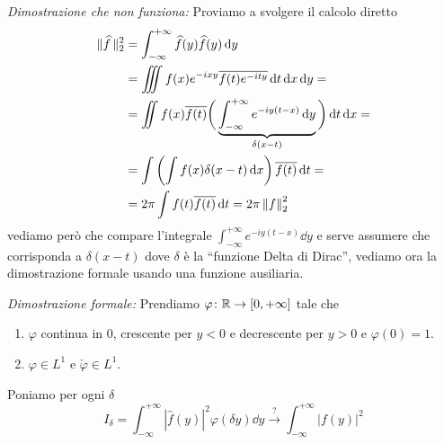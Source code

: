 \textit{Dimostrazione che non funziona:}
Proviamo a svolgere il calcolo diretto
$$
\begin{aligned}
	\|\widehat f\,\|_2^2 
	&= \int_{-\infty}^{+\infty} \widehat f(y) \widehat f(y) \,\mathrm{d} y \\
	&= \iiint f(x) e^{-ixy} \overline{f(t) e^{-ity}} \,\mathrm{d} t \,\mathrm{d} x \,\mathrm{d} y = \\
	&= \iint f(x) \overline{f(t)} \bigg( \underbrace{\int_{-\infty}^{+\infty} e^{-iy(t-x)} \,\mathrm{d} y}_{\delta(x-t)} \bigg) \,\mathrm{d} t \,\mathrm{d} x = \\
	&= \int \left( \int f(x) \delta(x - t) \,\mathrm{d} x \right) \overline{f(t)} \,\mathrm{d} t = \\
	&= 2\pi \int f(t) \overline{f(t)} \,\mathrm{d} t = 2\pi \left\lVert f \right\rVert_2^2
\end{aligned}
$$
vediamo però che compare l'integrale $\int_{-\infty}^{+\infty} e^{-iy(t-x)} \dd y$ e serve assumere che corrisponda a $\delta(x - t)$ dove $\delta$ è la ``funzione Delta di Dirac'', vediamo ora la dimostrazione formale usando una funzione ausiliaria.

\textit{Dimostrazione formale:}
Prendiamo $\varphi \colon \mathbb R \to [0,+\infty]$ tale che
\begin{enumerate}
	\item $\varphi$ continua in $0$, crescente per $y < 0$ e decrescente per $y > 0$ e $\varphi(0) = 1$.
	\item $\varphi \in L^1$ e $\check\varphi \in L^1$.
\end{enumerate}

Poniamo per ogni $\delta$
$$
I_\delta = \int_{-\infty}^{+\infty} |\hat f(y)|^2 \varphi(\delta y) \dd y
\xrightarrow{\text{?}}
\int_{-\infty}^{+\infty} |f(y)|^2
$$

